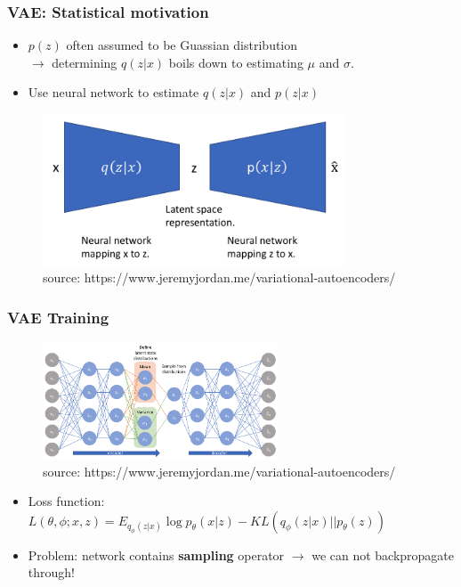 
\begin{frame}
\frametitle{VAE: Statistical motivation}

\begin{itemize}
\item $p(z)$ often assumed to be Guassian distribution \\ $\rightarrow$ determining $q(z|x)$ boils down to estimating $\mu$ and $\sigma$.
\item Use neural network to estimate $q(z|x)$ and $p(z|x)$
\end{itemize}


                \begin{figure}
                \centering
                \includegraphics[width=9cm]{plots/vae.png}
                \vspace{-6pt}
                \caption{\tiny{source: https://www.jeremyjordan.me/variational-autoencoders/}}
                \end{figure}
                \vspace{-10pt}

\end{frame}


\begin{frame}
\frametitle{VAE Training}

                \begin{figure}
                \centering
                \includegraphics[width=7cm]{plots/vae_training.png}
                \vspace{-6pt}
                \caption{\tiny{source: https://www.jeremyjordan.me/variational-autoencoders/}}
                \end{figure}
  
  
\begin{itemize}
\item Loss function: $ L(\theta, \phi; x, z) = E_{q_{\phi} ({z|x})} \log p_{\theta} ({x|z}) - KL ({q_{\phi} ({z|x})|| p_{\theta} (z)})$
\item Problem: network contains \textbf{sampling} operator $\rightarrow$ we can not backpropagate through!
\end{itemize}              

\end{frame}

